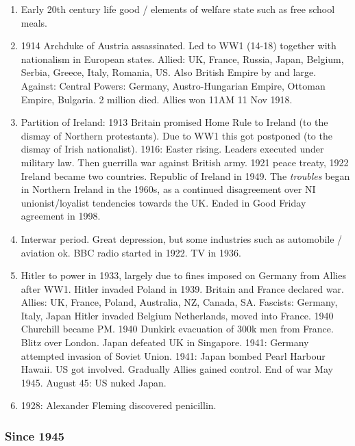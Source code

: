 \documentclass[10pt,reqno]{amsart}
\begin{document}
\begin{enumerate}[i]
\item Early 20th century life good / elements of welfare state such as free school meals. 
\item 1914 Archduke of Austria assassinated. Led to WW1 (14-18) together with nationalism in European states. 
Allied: UK, France, Russia, Japan, Belgium, Serbia, Greece, Italy, Romania, US. 
Also British Empire by and large. 
Against: Central Powers: Germany, Austro-Hungarian Empire, Ottoman Empire, Bulgaria.
2 million died. Allies won 11AM 11 Nov 1918.
\item Partition of Ireland:
1913 Britain promised Home Rule to Ireland (to the dismay of Northern protestants). Due to WW1 this got postponed (to the dismay of Irish nationalist). 1916: Easter rising. Leaders executed under military law. Then guerrilla war against British army. 1921 peace treaty, 1922 Ireland became two countries. Republic of Ireland in 1949. 
The \textit{troubles} began in Northern Ireland in the 1960s, as a continued disagreement over NI unionist/loyalist tendencies towards the UK. Ended in Good Friday agreement in 1998. 
\item Interwar period. Great depression, but some industries such as automobile / aviation ok. BBC radio started in 1922. TV in 1936.
\item Hitler to power in 1933, largely due to fines imposed on Germany from Allies after WW1. Hitler invaded Poland in 1939. Britain and France declared war. 
Allies: UK, France, Poland, Australia, NZ, Canada, SA. 
Fascists: Germany, Italy, Japan
Hitler invaded Belgium Netherlands, moved into France. 
1940 Churchill became PM. 
1940 Dunkirk evacuation of 300k men from France.
Blitz over London.
Japan defeated UK in Singapore.
1941: Germany attempted invasion of Soviet Union. 
1941: Japan bombed Pearl Harbour Hawaii. US got involved. 
Gradually Allies gained control. End of war May 1945. 
August 45: US nuked Japan. 
\item 1928: Alexander Fleming discovered penicillin. 
\end{enumerate}


\subsubsection{Since 1945}
\end{document}

